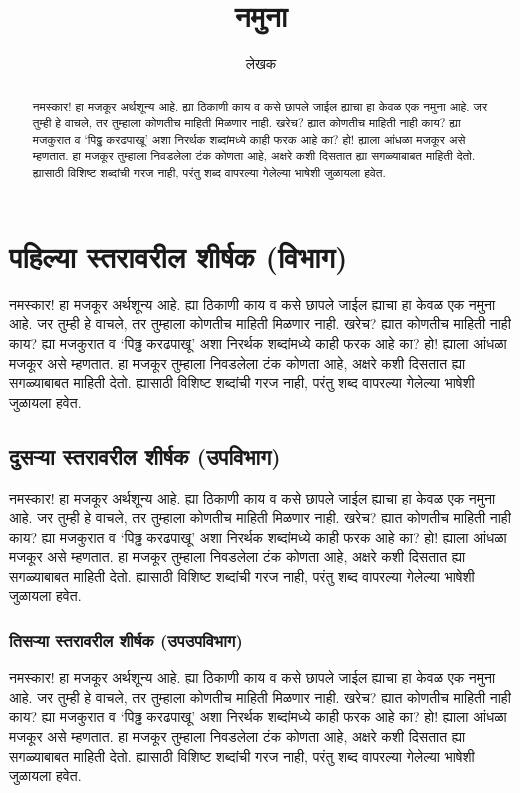\title{नमुना}
\author{लेखक}

\maketitle

\begin{abstract}
नमस्कार! हा मजकूर अर्थशून्य आहे. ह्या ठिकाणी काय व कसे छापले जाईल ह्याचा हा केवळ एक नमुना
आहे. जर तुम्ही हे वाचले, तर तुम्हाला कोणतीच माहिती मिळणार नाही. खरेच? ह्यात कोणतीच माहिती
नाही काय? ह्या मजकुरात व `पिढ्ढ करढपाखू' अशा निरर्थक शब्दांमध्ये काही फरक आहे का? हो!
ह्याला आंधळा मजकूर असे म्हणतात. हा मजकूर तुम्हाला निवडलेला टंक कोणता आहे, अक्षरे कशी दिसतात
ह्या सगळ्याबाबत माहिती देतो. ह्यासाठी विशिष्ट शब्दांची गरज नाही, परंतु शब्द वापरल्या गेलेल्या
भाषेशी जुळायला हवेत.
\end{abstract}

\tableofcontents

\section{पहिल्या स्तरावरील शीर्षक (विभाग)}
नमस्कार! हा मजकूर अर्थशून्य आहे. ह्या ठिकाणी काय व कसे छापले जाईल ह्याचा हा केवळ एक नमुना
आहे. जर तुम्ही हे वाचले, तर तुम्हाला कोणतीच माहिती मिळणार नाही. खरेच? ह्यात कोणतीच माहिती
नाही काय? ह्या मजकुरात व `पिढ्ढ करढपाखू' अशा निरर्थक शब्दांमध्ये काही फरक आहे का? हो!
ह्याला आंधळा मजकूर असे म्हणतात. हा मजकूर तुम्हाला निवडलेला टंक कोणता आहे, अक्षरे कशी दिसतात
ह्या सगळ्याबाबत माहिती देतो. ह्यासाठी विशिष्ट शब्दांची गरज नाही, परंतु शब्द वापरल्या गेलेल्या
भाषेशी जुळायला हवेत.

\subsection{दुसऱ्या स्तरावरील शीर्षक (उपविभाग)}
नमस्कार! हा मजकूर अर्थशून्य आहे. ह्या ठिकाणी काय व कसे छापले जाईल ह्याचा हा केवळ एक नमुना
आहे. जर तुम्ही हे वाचले, तर तुम्हाला कोणतीच माहिती मिळणार नाही. खरेच? ह्यात कोणतीच माहिती
नाही काय? ह्या मजकुरात व `पिढ्ढ करढपाखू' अशा निरर्थक शब्दांमध्ये काही फरक आहे का? हो!
ह्याला आंधळा मजकूर असे म्हणतात. हा मजकूर तुम्हाला निवडलेला टंक कोणता आहे, अक्षरे कशी दिसतात
ह्या सगळ्याबाबत माहिती देतो. ह्यासाठी विशिष्ट शब्दांची गरज नाही, परंतु शब्द वापरल्या गेलेल्या
भाषेशी जुळायला हवेत.

\subsubsection{तिसऱ्या स्तरावरील शीर्षक (उपउपविभाग)}
नमस्कार! हा मजकूर अर्थशून्य आहे. ह्या ठिकाणी काय व कसे छापले जाईल ह्याचा हा केवळ एक नमुना
आहे. जर तुम्ही हे वाचले, तर तुम्हाला कोणतीच माहिती मिळणार नाही. खरेच? ह्यात कोणतीच माहिती
नाही काय? ह्या मजकुरात व `पिढ्ढ करढपाखू' अशा निरर्थक शब्दांमध्ये काही फरक आहे का? हो!
ह्याला आंधळा मजकूर असे म्हणतात. हा मजकूर तुम्हाला निवडलेला टंक कोणता आहे, अक्षरे कशी दिसतात
ह्या सगळ्याबाबत माहिती देतो. ह्यासाठी विशिष्ट शब्दांची गरज नाही, परंतु शब्द वापरल्या गेलेल्या
भाषेशी जुळायला हवेत.

